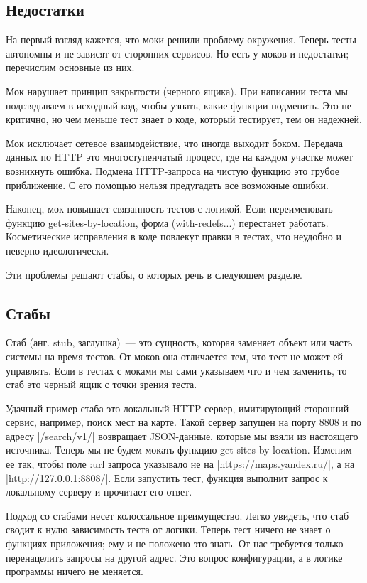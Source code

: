 \subsection{Недостатки}

На первый взгляд кажется, что моки решили проблему окружения. Теперь тесты
автономны и не зависят от сторонних сервисов. Но есть у моков и недостатки;
перечислим основные из них.

Мок нарушает принцип закрытости (черного ящика). При написании теста мы
подглядываем в исходный код, чтобы узнать, какие функции подменить. Это не
критично, но чем меньше тест знает о коде, который тестирует, тем он надежней.

Мок исключает сетевое взаимодействие, что иногда выходит боком. Передача данных
по HTTP это многоступенчатый процесс, где на каждом участке может возникнуть
ошибка. Подмена HTTP-запроса на чистую функцию это грубое приближение. С его
помощью нельзя предугадать все возможные ошибки.

Наконец, мок повышает связанность тестов с логикой. Если переименовать функцию
get-sites-by-location, форма (with-redefs...) перестанет работать. Косметические
исправления в коде повлекут правки в тестах, что неудобно и неверно
идеологически.

Эти проблемы решают стабы, о которых речь в следующем разделе.

\subsection{Стабы}

Стаб (анг. stub, заглушка)~--- это сущность, которая заменяет объект или часть
системы на время тестов. От моков она отличается тем, что тест не может ей
управлять. Если в тестах с моками мы сами указываем что и чем заменить, то стаб
это черный ящик с точки зрения теста.

Удачный пример стаба это локальный HTTP-сервер, имитирующий сторонний сервис,
например, поиск мест на карте. Такой сервер запущен на порту 8808 и по адресу
\spverb|/search/v1/| возвращает JSON-данные, которые мы взяли из настоящего
источника. Теперь мы не будем мокать функцию get-sites-by-location. Изменим ее
так, чтобы поле :url запроса указывало не на \spverb|https://maps.yandex.ru/|, а на
\spverb|http://127.0.0.1:8808/|. Если запустить тест, функция выполнит запрос к
локальному серверу и прочитает его ответ.

Подход со стабами несет колоссальное преимущество. Легко увидеть, что стаб
сводит к нулю зависимость теста от логики. Теперь тест ничего не знает о
функциях приложения; ему и не положено это знать. От нас требуется только
перенацелить запросы на другой адрес. Это вопрос конфигурации, а в логике
программы ничего не меняется.

